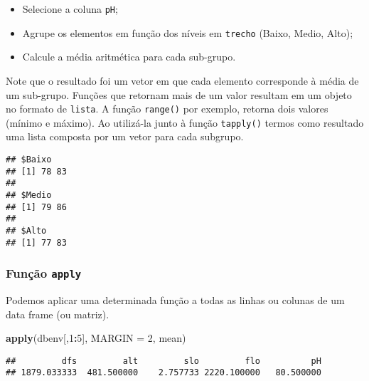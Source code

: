 \documentclass[
]{book}
\newenvironment{Shaded}{\begin{snugshade}}{\end{snugshade}}
\newcommand{\DataTypeTok}[1]{\textcolor[rgb]{0.13,0.29,0.53}{#1}}
\newcommand{\DecValTok}[1]{\textcolor[rgb]{0.00,0.00,0.81}{#1}}
\newcommand{\KeywordTok}[1]{\textcolor[rgb]{0.13,0.29,0.53}{\textbf{#1}}}
\newcommand{\NormalTok}[1]{#1}
\newcommand{\OperatorTok}[1]{\textcolor[rgb]{0.81,0.36,0.00}{\textbf{#1}}}
\providecommand{\tightlist}{%
  \setlength{\itemsep}{0pt}\setlength{\parskip}{0pt}}
\begin{document}
\begin{itemize}
\tightlist
\item
  Selecione a coluna \texttt{pH};
\item
  Agrupe os elementos em função dos níveis em \texttt{trecho} (Baixo, Medio, Alto);
\item
  Calcule a média aritmética para cada sub-grupo.
\end{itemize}

Note que o resultado foi um vetor em que cada elemento corresponde à média de um sub-grupo. Funções que retornam mais de um valor resultam em um objeto no formato de \texttt{lista}. A função \texttt{range()} por exemplo, retorna dois valores (mínimo e máximo). Ao utilizá-la junto à função \texttt{tapply()} termos como resultado uma lista composta por um vetor para cada subgrupo.

\begin{Shaded}
\end{Shaded}

\begin{verbatim}
## $Baixo
## [1] 78 83
## 
## $Medio
## [1] 79 86
## 
## $Alto
## [1] 77 83
\end{verbatim}

\hypertarget{funuxe7uxe3o-apply}{%
\subsubsection*{\texorpdfstring{Função \texttt{apply}}{Função apply}}\label{funuxe7uxe3o-apply}}

Podemos aplicar uma determinada função a todas as linhas ou colunas de um data frame (ou matriz).

\begin{Shaded}
\begin{Highlighting}[]
\KeywordTok{apply}\NormalTok{(dbenv[,}\DecValTok{1}\OperatorTok{:}\DecValTok{5}\NormalTok{], }\DataTypeTok{MARGIN =} \DecValTok{2}\NormalTok{, mean)}
\end{Highlighting}
\end{Shaded}

\begin{verbatim}
##         dfs         alt         slo         flo          pH 
## 1879.033333  481.500000    2.757733 2220.100000   80.500000
\end{verbatim}
\end{document}
